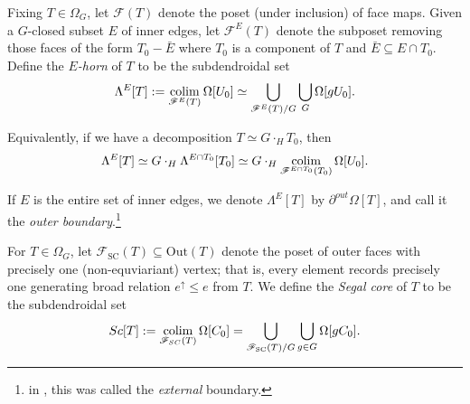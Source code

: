 \documentclass[a4paper,10pt,draft]{article}%
\begin{document}
\begin{definition}
      Fixing $T\in \Omega_G$,
      let $\mathscr{F}(T)$ denote the poset (under inclusion) of face maps.
      Given a $G$-closed subset $E$ of inner edges, let
      $\mathscr{F}^{E}(T)$ denote the subposet removing those faces of the form
      $T_0 - \bar E$
      where $T_0$ is a component of $T$ and $\bar E \subseteq E \cap T_0$.
      Define the \textit{$E$-horn} of $T$ to be the subdendroidal set
      \begin{equation}
            \Lambda^{E}[T]
            := \mathop{\operatorname{colim}}\limits_{\mathscr{F}^E(T)} \Omega[U_0]
            \simeq \mathop{\bigcup}\limits_{\mathscr{F}^E(T)/G}\mathop{\bigcup}\limits_{G}\Omega[g U_0].
      \end{equation}
  \end{definition}

\begin{remark}
      Equivalently, if we have a decomposition $T \simeq G \cdot_H T_0$, then
      \begin{equation}
            \Lambda^{E}[T] \simeq G \cdot_H \Lambda^{E \cap T_0}[T_0]
            \simeq G \cdot_H \mathop{\operatorname{colim}}\limits_{\mathscr{F}^{E \cap T_0}(T_0)}\Omega[U_0].
      \end{equation}
\end{remark}

\begin{remark}
      If $E$ is the entire set of inner edges, we denote $\Lambda^{E}[T]$ by $\partial^{out}\Omega[T]$,
      and call it the \textit{outer boundary}.\footnote{
        in \cite{CM13a}, this was called the \textit{external} boundary.}
\end{remark}

\begin{definition}
      For $T \in \Omega_G$, let $\mathscr{F}_{\mathrm{SC}}(T) \subseteq \mathrm{Out}(T)$ denote the poset of outer faces
      with precisely one (non-equviariant) vertex;
      that is, every element records precisely one generating broad relation
      $e^\uparrow \leq e$ from $T$.
      We define the \textit{Segal core} of $T$ to be the subdendroidal set
      \begin{equation}
            Sc[T] :=
            \mathop{\operatorname{colim}}\limits_{\mathscr{F}_{SC}(T)} \Omega[C_0]
            = \mathop{\bigcup}\limits_{\mathscr{F}_{\mathrm{SC}}(T)/G}\mathop{\bigcup}\limits_{g \in G}\Omega[g C_0].
      \end{equation}
\end{definition}
\end{document}
